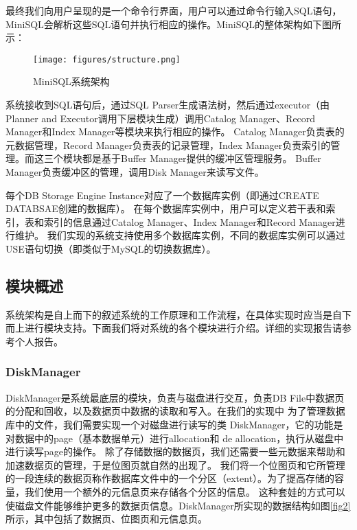 \documentclass[12pt,hyperref,a4paper,UTF8]{ctexart}
\begin{document}
最终我们向用户呈现的是一个命令行界面，用户可以通过命令行输入SQL语句，MiniSQL会解析这些SQL语句并执行相应的操作。MiniSQL的整体架构如下图所示：

\begin{figure}[!htbp]
    \centering
    \texttt{[image: figures/structure.png]}
    \caption{MiniSQL系统架构}
    \label{fig1}
\end{figure}

系统接收到SQL语句后，通过SQL Parser生成语法树，然后通过executor（由Planner and Executor调用下层模块生成）调用Catalog Manager、Record Manager和Index Manager等模块来执行相应的操作。
Catalog Manager负责表的元数据管理，Record Manager负责表的记录管理，Index Manager负责索引的管理。而这三个模块都是基于Buffer Manager提供的缓冲区管理服务。
Buffer Manager负责缓冲区的管理，调用Disk Manager来读写文件。

每个DB Storage Engine Instance对应了一个数据库实例（即通过CREATE DATABSAE创建的数据库）。
在每个数据库实例中，用户可以定义若干表和索引，表和索引的信息通过Catalog Manager、Index Manager和Record Manager进行维护。
我们实现的系统支持使用多个数据库实例，不同的数据库实例可以通过USE语句切换（即类似于MySQL的切换数据库）。

\subsection{模块概述}

系统架构是自上而下的叙述系统的工作原理和工作流程，在具体实现时应当是自下而上进行模块支持。下面我们将对系统的各个模块进行介绍。详细的实现报告请参考个人报告。

\subsubsection{DiskManager}

DiskManager是系统最底层的模块，负责与磁盘进行交互，负责DB File中数据页的分配和回收，以及数据页中数据的读取和写入。在我们的实现中
为了管理数据库中的文件，我们需要实现一个对磁盘进行读写的类 DiskManager，它的功能是对数据中的page（基本数据单元）进行allocation和 de allocation，执行从磁盘中进行读写page的操作。
除了存储数据的数据页，我们还需要一些元数据来帮助和加速数据页的管理，于是位图页就自然的出现了。
我们将一个位图页和它所管理的一段连续的数据页称作数据库文件中的一个分区（extent）。为了提高存储的容量，我们使用一个额外的元信息页来存储各个分区的信息。
这种套娃的方式可以使磁盘文件能够维护更多的数据页信息。DiskManager所实现的数据结构如图\ref{fig2}所示，其中包括了数据页、位图页和元信息页。
\end{document}
